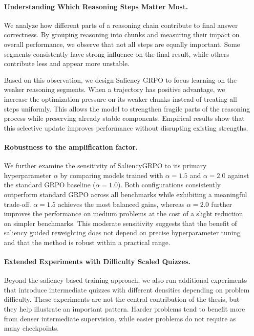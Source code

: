 \documentclass[12pt]{report}
\begin{document}
\paragraph{Understanding Which Reasoning Steps Matter Most.}
We analyze how different parts of a reasoning chain contribute to final answer correctness. By grouping reasoning into chunks and measuring their impact on overall performance, we observe that not all steps are equally important. Some segments consistently have strong influence on the final result, while others contribute less and appear more unstable.

Based on this observation, we design Saliency GRPO to focus learning on the weaker reasoning segments. When a trajectory has positive advantage, we increase the optimization pressure on its weaker chunks instead of treating all steps uniformly. This allows the model to strengthen fragile parts of the reasoning process while preserving already stable components. Empirical results show that this selective update improves performance without disrupting existing strengths.

\paragraph{Robustness to the amplification factor.}
We further examine the sensitivity of SaliencyGRPO to its primary hyperparameter $\alpha$ by comparing models trained with $\alpha= 1.5$ and $\alpha= 2.0$ against the standard GRPO baseline ($\alpha= 1.0$). 
Both configurations consistently outperform standard GRPO across all
benchmarks while exhibiting a meaningful trade-off. $\alpha = 1.5$
achieves the most balanced gains, whereas $\alpha = 2.0$ further
improves the performance on medium problems at the cost of a slight
reduction on simpler benchmarks.
This moderate sensitivity suggests that the benefit of saliency guided reweighting does not depend on precise hyperparameter tuning and that the method is robust within a practical range.

\paragraph{Extended Experiments with Difficulty Scaled Quizzes.}
Beyond the saliency based training approach, we also run additional experiments that introduce intermediate quizzes with different densities depending on problem difficulty. These experiments are not the central contribution of the thesis, but they help illustrate an important pattern. Harder problems tend to benefit more from denser intermediate supervision, while easier problems do not require as many checkpoints.
\end{document}
